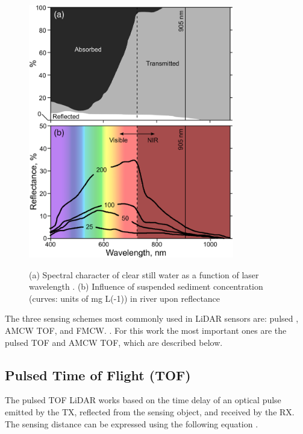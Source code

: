 \begin{figure}[h]
    \centering
    \caption{(a) Spectral character of clear still water as a function of laser wavelength \cite{lednev_2013_remote,milan_2010_mapping}. (b) Influence of suspended sediment concentration (curves: units of mg L(-1)) in river upon reflectance \cite{paul_2020_a, milan_2010_mapping}}
    \includegraphics[width=0.8\textwidth]{figuras/light-absorption.png}
    \label{fig:laser-wavelength-graphs}
\end{figure}

The three sensing schemes most commonly used in LiDAR sensors are: pulsed , AMCW \gls{TOF}, and FMCW. \cite{li_2022_a,behroozpour_2017_lidar}. For this work the most important ones are the pulsed \gls{TOF} and AMCW \gls{TOF}, which are described below.

\subsection{Pulsed Time of Flight (TOF)}
The pulsed TOF LiDAR works based on the time delay of an optical pulse emitted by the TX, reflected from the sensing object, and received by the RX. The sensing distance can be expressed using the following equation \cite{li_2022_a}.

